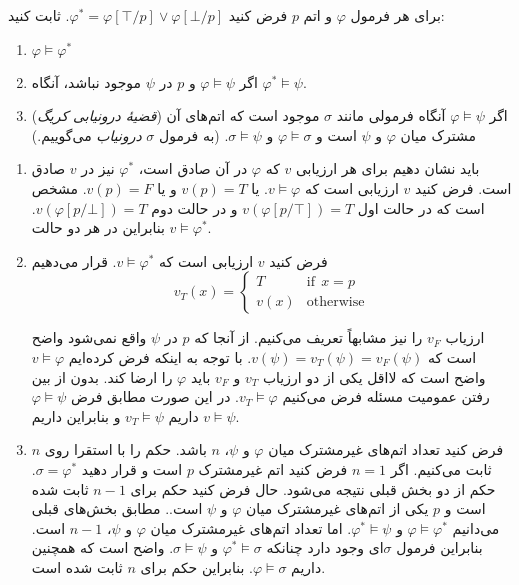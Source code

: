 برای هر فرمول $\varphi$ و اتم $p$ فرض کنید
$\varphi^*=\varphi[\top/p]\vee \varphi[\bot/p]$.
ثابت کنید:
\begin{enumerate}
\item
$\varphi\models \varphi^*$
\item
اگر
$\varphi\models \psi$
و $p$ در $\psi$ موجود نباشد، آنگاه
$\varphi^*\models \psi$.
\item
(\emph{قضیهٔ درونیابی کریگ})
اگر
$\varphi\models \psi$
آنگاه فرمولی مانند $\sigma$ موجود است که اتم‌های آن مشترک میان $\varphi$ و $\psi$ است و $\varphi\models \sigma$ و $\sigma\models \psi$.
(به فرمول $\sigma$ \emph{درونیاب} می‌گوییم.)%

\end{enumerate}\quad\vspace{-1cm}
\begin{ans}
  \begin{enumerate}
  \item باید نشان دهیم برای هر ارزیابی $v$ که $\varphi$ در آن صادق است، $\varphi^*$ نیز در $v$ صادق است.
  فرض کنید $v$ ارزیابی است که $v\models \varphi$. یا $v(p)=T$ و یا $v(p)=F$. مشخص است که در حالت اول
  $v(\varphi[p/\top])=T$
  و در حالت دوم
  $v(\varphi[p/\bot])=T$.
  بنابراین در هر دو حالت
  $v\models \varphi^*$.

  \item
  فرض کنید $v$ ارزیابی است که $v\models \varphi^*$. قرار می‌دهیم
  $$
  v_T(x)=
  \begin{cases}
  T & \text{if}~~x=p\\
  v(x) & \text{otherwise}
  \end{cases}
  $$

  ارزیاب $v_F$ را نیز مشابهاً تعریف می‌کنیم. از آنجا که $p$ در $\psi$ واقع نمی‌شود واضح است که $v(\psi)=v_T(\psi)=v_F(\psi)$. با توجه به اینکه فرض کرده‌ایم $v\models \varphi$ واضح است که لااقل یکی از دو ارزیاب $v_T$ و $v_F$ باید $\varphi$ را ارضا کند. بدون از بین رفتن عمومیت مسئله فرض می‌کنیم $v_T\models \varphi$. در این صورت مطابق فرض $\varphi\models \psi$ داریم $v_T\models \psi$ و بنابراین داریم $v\models \psi$.

  \item
  فرض کنید تعداد اتم‌های غیرمشترک میان $\varphi$ و $\psi$، $n$ باشد. حکم را با استقرا روی $n$ ثابت می‌کنیم. اگر $n=1$ فرض کنید اتم غیرمشترک $p$ است و قرار دهید $\sigma=\varphi^*$. حکم از دو بخش قبلی نتیجه می‌شود. حال فرض کنید حکم برای $n-1$ ثابت شده است و $p$ یکی از اتم‌های غیرمشترک میان $\varphi$ و $\psi$ است.. مطابق بخش‌های قبلی می‌دانیم $\varphi\models \varphi^*$ و $\varphi^*\models \psi$. اما تعداد اتم‌های غیرمشترک میان $\varphi$ و $\psi$، $n-1$ است. بنابراین فرمول $\sigma$ای وجود دارد چنانکه $\varphi^*\models \sigma$ و $\sigma\models \psi$. واضح است که همچنین داریم $\varphi\models \sigma$. بنابراین حکم برای $n$ ثابت شده است.
  \end{enumerate}
\end{ans}